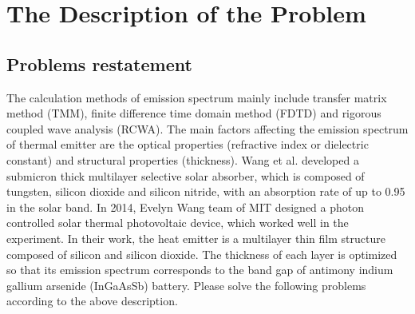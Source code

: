 \documentclass{apmcmthesis}
\begin{document}
\newpage
\section{The Description of the Problem}
\subsection{Problems restatement}
\hspace{2em}The calculation methods of emission spectrum mainly include transfer matrix method (TMM), finite difference time domain method (FDTD) and rigorous coupled wave analysis (RCWA). The main factors affecting the emission spectrum of thermal emitter are the optical properties (refractive index or dielectric constant) and structural properties (thickness). Wang et al. developed a submicron thick multilayer selective solar absorber, which is composed of tungsten, silicon dioxide and silicon nitride, with an absorption rate of up to 0.95 in the solar band. In 2014, Evelyn Wang team of MIT designed a photon controlled solar thermal photovoltaic device, which worked well in the experiment. In their work, the heat emitter is a multilayer thin film structure composed of silicon and silicon dioxide. The thickness of each layer is optimized so that its emission spectrum corresponds to the band gap of antimony indium gallium arsenide (InGaAsSb) battery. Please solve the following problems according to the above description.
\end{document}

